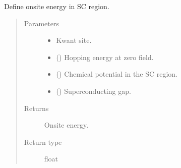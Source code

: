 \documentclass[letterpaper,10pt,english]{sphinxmanual}
\begin{document}
\begin{fulllineitems}
\label{\detokenize{modules:modules.functions.onsite_sc}}
\pysigstartsignatures
{}
\pysigstopsignatures
\sphinxAtStartPar
Define onsite energy in SC region.
\begin{quote}\begin{description}
\item[{Parameters}] \leavevmode\begin{itemize}
\item {} 
\sphinxAtStartPar
{} \textendash{} Kwant site.

\item {} 
\sphinxAtStartPar
{} () \textendash{} Hopping energy at zero field.

\item {} 
\sphinxAtStartPar
{} () \textendash{} Chemical potential in the SC region.

\item {} 
\sphinxAtStartPar
{} () \textendash{} Superconducting gap.

\end{itemize}

\item[{Returns}] \leavevmode
\sphinxAtStartPar
Onsite energy.

\item[{Return type}] \leavevmode
\sphinxAtStartPar
float

\end{description}\end{quote}

\end{fulllineitems}

\end{document}
